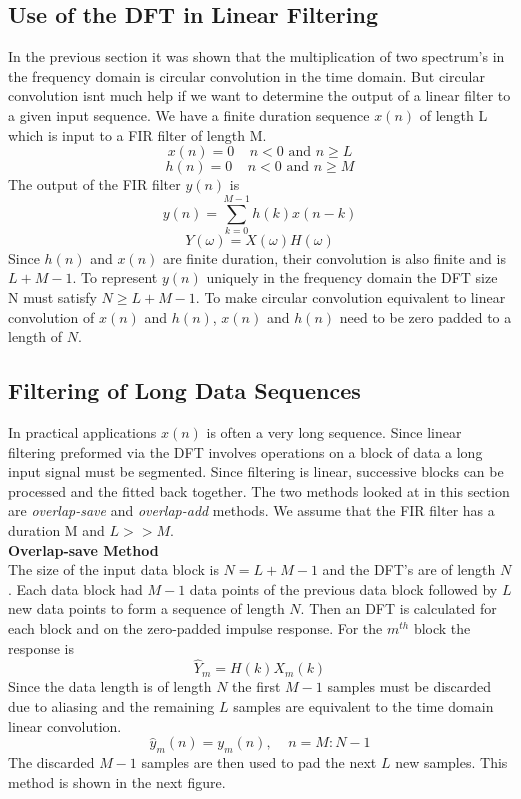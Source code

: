 \documentclass{article} %
\begin{document}
	\subsection{Use of the DFT in Linear Filtering}
	In the previous section it was shown that the multiplication of two spectrum's in the frequency domain is circular convolution in the time domain. But circular convolution isnt much help if we want to determine the output of a linear filter to a given input sequence. 
	We have a finite duration sequence $x(n)$ of length L which is input to a FIR filter of length M.
	\begin{equation}
	x(n) = 0 \;\;\;\; n < 0 \text{ and } n \ge L
	\end{equation}
	\begin{equation}
	h(n) = 0 \;\;\;\; n < 0 \text{ and } n \ge M
	\end{equation}
	The output of the FIR filter $y(n)$ is
	\begin{equation}
	y(n) = \sum_{k=0}^{M-1}h(k)x(n-k)
	\end{equation}
	\begin{equation}
	Y(\omega) = X(\omega)H(\omega)
	\end{equation}
	Since $h(n)$ and $x(n)$ are finite duration, their convolution is also finite and is $L + M -1$. To represent $y(n)$ uniquely in the frequency domain the DFT size N must satisfy $N \ge L + M -1$. To make circular convolution equivalent to linear convolution of $x(n)$ and $h(n)$, $x(n)$ and $h(n)$ need to be zero padded to a length of $N$. 
	\subsection{Filtering of Long Data Sequences}
	In practical applications $x(n)$ is often a very long sequence. Since linear filtering preformed via the DFT involves operations on a block of data a long input signal must be segmented. Since filtering is linear, successive blocks can be processed and the fitted back together. The two methods looked at in this section are \textit{overlap-save} and \textit{overlap-add} methods. We assume that the FIR filter has a duration M and $L >> M$. \\
	\textbf{Overlap-save Method}\\
	The size of the input data block is $N = L + M -1$ and the DFT's are of length $N$. Each data block had $M-1$ data points of the previous data block followed by $L$ new data points to form a sequence of length $N$. Then an DFT is calculated for each block and on the zero-padded impulse response. For the $m^{th}$ block the response is
	\begin{equation}
	\hat{Y}_m = H(k)X_m(k)
	\end{equation}
	Since the data length is of length $N$ the first $M-1$ samples must be discarded due to aliasing and the remaining $L$ samples are equivalent to the time domain linear convolution. 
	\begin{equation}
	\hat{y}_m(n) = y_m(n), \;\;\;\; n = M:N-1
	\end{equation}
	The discarded $M-1$ samples are then used to pad the next $L$ new samples. This method is shown in the next figure.
	
\end{document}
